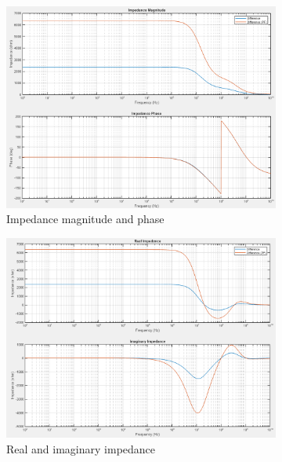 \begin{figure}[h]
    \centering
    \begin{subfigure}[b]{0.45\textwidth}
        \centering
        \includegraphics[width=\textwidth]{images/IS_APP_mag_phase.png}
        \caption{Impedance magnitude and phase}
    \end{subfigure}
    \hfill
    \begin{subfigure}[b]{0.45\textwidth}
        \centering
        \includegraphics[width=\textwidth]{images/IS_APP_real_imag.png}
        \caption{Real and imaginary impedance}
    \end{subfigure}
    \\
    \vspace{0.1 in}
    \begin{subfigure}[b]{0.45\textwidth}

\end{subfigure}
\end{figure}
